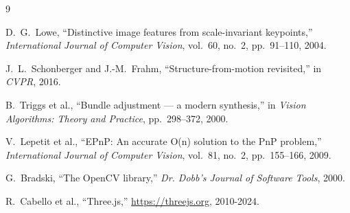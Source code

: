 \documentclass[10pt,twocolumn,letterpaper]{article}
\begin{document}
{\small

\begin{thebibliography}{9}

D.~G.~Lowe,
``Distinctive image features from scale-invariant keypoints,''
\emph{International Journal of Computer Vision}, vol.~60, no.~2, pp.~91--110, 2004.

J.~L.~Schonberger and J.-M.~Frahm,
``Structure-from-motion revisited,''
in \emph{CVPR}, 2016.

B.~Triggs et al.,
``Bundle adjustment — a modern synthesis,''
in \emph{Vision Algorithms: Theory and Practice}, pp.~298--372, 2000.

V.~Lepetit et al.,
``EPnP: An accurate O(n) solution to the PnP problem,''
\emph{International Journal of Computer Vision}, vol.~81, no.~2, pp.~155--166, 2009.

G.~Bradski,
``The OpenCV library,''
\emph{Dr. Dobb's Journal of Software Tools}, 2000.

R.~Cabello et al.,
``Three.js,'' \url{https://threejs.org}, 2010-2024.

\end{thebibliography}
}
\end{document}

